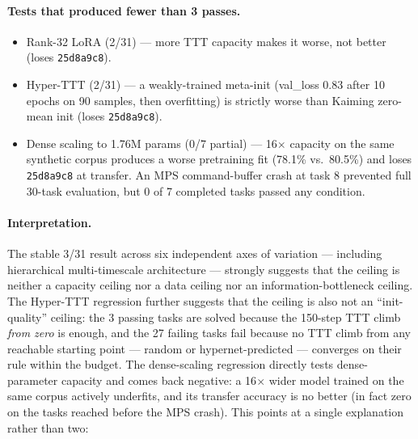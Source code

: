 \documentclass[11pt]{article}
\begin{document}
\paragraph{Tests that produced fewer than 3 passes.}
\begin{itemize}
    \item Rank-32 LoRA (2/31) --- more TTT capacity makes it worse, not better (loses \texttt{25d8a9c8}).
    \item Hyper-TTT (2/31) --- a weakly-trained meta-init (val\_loss 0.83 after 10 epochs on 90 samples, then overfitting) is strictly worse than Kaiming zero-mean init (loses \texttt{25d8a9c8}).
    \item Dense scaling to 1.76M params (0/7 partial) --- 16$\times$ capacity on the same synthetic corpus produces a worse pretraining fit (78.1\% vs.\ 80.5\%) and loses \texttt{25d8a9c8} at transfer. An MPS command-buffer crash at task 8 prevented full 30-task evaluation, but 0 of 7 completed tasks passed any condition.
\end{itemize}

\paragraph{Interpretation.} The stable 3/31 result across six independent axes of variation --- including hierarchical multi-timescale architecture --- strongly suggests that the ceiling is neither a capacity ceiling nor a data ceiling nor an information-bottleneck ceiling. The Hyper-TTT regression further suggests that the ceiling is also not an ``init-quality'' ceiling: the 3 passing tasks are solved because the 150-step TTT climb \emph{from zero} is enough, and the 27 failing tasks fail because no TTT climb from any reachable starting point --- random or hypernet-predicted --- converges on their rule within the budget. The dense-scaling regression directly tests dense-parameter capacity and comes back negative: a 16$\times$ wider model trained on the same corpus actively underfits, and its transfer accuracy is no better (in fact zero on the tasks reached before the MPS crash). This points at a single explanation rather than two:
\end{document}
